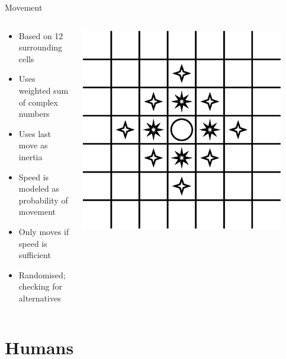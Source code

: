 \documentclass{beamer}
\begin{document}
\begin{frame}{Movement}
    \begin{columns}
        \begin{column}{.5\textwidth}
            \begin{itemize}
                \item Based on 12 surrounding cells
                \item Uses weighted sum of complex numbers
                \item Uses last move as inertia
                \item Speed is modeled as probability of movement
                \item Only moves if speed is sufficient
                \item Randomised; checking for alternatives
            \end{itemize}
        \end{column}
        \begin{column}{.5\textwidth}
            \includegraphics[width=0.9\textwidth]{movement}
        \end{column}
    \end{columns}
\end{frame}

\section{Humans}
\end{document}
